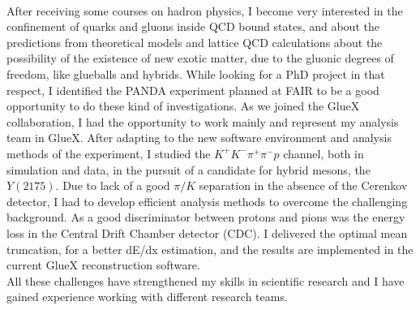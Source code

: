 \documentclass[a4paper]{article}
\begin{document}
~\par After receiving some courses on hadron physics, I become very interested in the confinement of quarks and gluons inside QCD bound states, and about the predictions from theoretical models and lattice QCD calculations about the possibility of the existence of new exotic matter, due to the gluonic degrees of freedom, like glueballs and hybrids. While looking for a PhD project in that respect, I identified the PANDA experiment planned at FAIR to be a good opportunity to do these kind of investigations. As we joined the GlueX collaboration, I had the opportunity to work mainly and represent my analysis team in GlueX. After adapting to the new software environment and analysis methods of the experiment, I studied the $K^{+}K^{-}\pi^{+}\pi^{-}p$ channel, both in simulation and data, in the pursuit of a candidate for hybrid mesons, the $Y(2175)$. Due to lack of a good $\pi/K$ separation in the absence of the Cerenkov detector, I had to develop efficient analysis methods to overcome the challenging background. As a good discriminator between protons and pions was the energy loss in the Central Drift Chamber detector (CDC). I delivered the optimal mean truncation, for a better dE/dx estimation, and the results are implemented in the current GlueX reconstruction software.\\
All these challenges have strengthened my skills in scientific research and I have gained experience working with different research teams.
\end{document}
